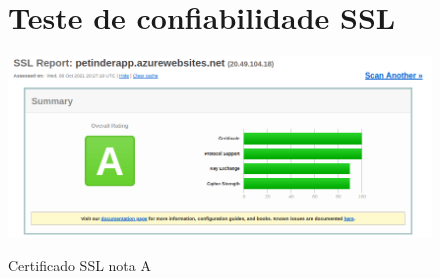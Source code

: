 \begin{apendicesenv}
\begin{figure}[htb]
\chapter{Teste de confiabilidade SSL}
\label{teste-ssl}
    \centering
    \caption{Certificado SSL nota A}
    \includegraphics[scale=0.65,angle=90]{imagens/certificado_ssl.png}
    \label{teste-ssl-img}
\end{figure}
\end{apendicesenv}
